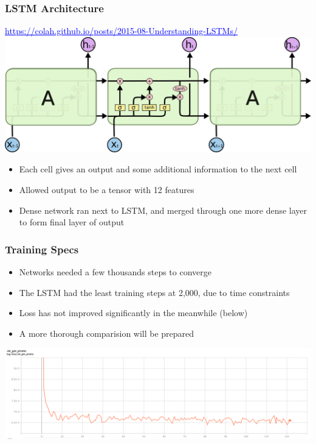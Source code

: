 \documentclass{beamer}
\newcommand{\link}[2]{\href{#2}{\textcolor{blue}{\underline{#1}}}}
\begin{document}
\begin{frame}
  \frametitle{LSTM Architecture}

  \link{https://colah.github.io/posts/2015-08-Understanding-LSTMs/}{https://colah.github.io/posts/2015-08-Understanding-LSTMs/}
  \includegraphics[width=\linewidth]{LSTM3-chain.png}

  \begin{itemize}
  \item Each cell gives an output and some additional information to the next cell
  \item Allowed output to be a tensor with 12 features
  \item Dense network ran next to LSTM,
    and merged through one more dense layer
    to form final layer of output
  \end{itemize}

\end{frame}

\begin{frame}
  \frametitle{Training Specs}

  \begin{itemize}
  \item Networks needed a few thousands steps to converge
  \item The LSTM had the least training steps at 2,000, due to time constraints
  \item Loss has not improved significantly in the meanwhile (below)
  \item A more thorough comparision will be prepared
  \end{itemize}

  \includegraphics[width=\linewidth]{Screenshot_2019-08-13_TensorBoard.png}

\end{frame}
\end{document}
